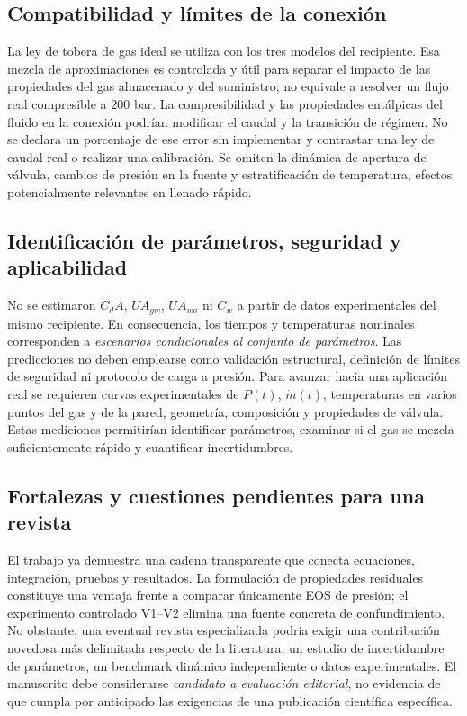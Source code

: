 \documentclass[11pt,letterpaper]{article}
\begin{document}
\subsection{Compatibilidad y límites de la conexión}
La ley de tobera de gas ideal se utiliza con los tres modelos del recipiente. Esa mezcla de aproximaciones es controlada y útil para separar el impacto de las propiedades del gas almacenado y del suministro; no equivale a resolver un flujo real compresible a 200 bar. La compresibilidad y las propiedades entálpicas del fluido en la conexión podrían modificar el caudal y la transición de régimen. No se declara un porcentaje de ese error sin implementar y contrastar una ley de caudal real o realizar una calibración. Se omiten la dinámica de apertura de válvula, cambios de presión en la fuente y estratificación de temperatura, efectos potencialmente relevantes en llenado rápido.

\subsection{Identificación de parámetros, seguridad y aplicabilidad}
No se estimaron $C_dA$, $UA_{gw}$, $UA_{wa}$ ni $C_w$ a partir de datos experimentales del mismo recipiente. En consecuencia, los tiempos y temperaturas nominales corresponden a \emph{escenarios condicionales al conjunto de parámetros}. Las predicciones no deben emplearse como validación estructural, definición de límites de seguridad ni protocolo de carga a presión. Para avanzar hacia una aplicación real se requieren curvas experimentales de $P(t)$, $\dot m(t)$, temperaturas en varios puntos del gas y de la pared, geometría, composición y propiedades de válvula. Estas mediciones permitirían identificar parámetros, examinar si el gas se mezcla suficientemente rápido y cuantificar incertidumbres.

\subsection{Fortalezas y cuestiones pendientes para una revista}
El trabajo ya demuestra una cadena transparente que conecta ecuaciones, integración, pruebas y resultados. La formulación de propiedades residuales constituye una ventaja frente a comparar únicamente EOS de presión; el experimento controlado V1--V2 elimina una fuente concreta de confundimiento. No obstante, una eventual revista especializada podría exigir una contribución novedosa más delimitada respecto de la literatura, un estudio de incertidumbre de parámetros, un benchmark dinámico independiente o datos experimentales. El manuscrito debe considerarse \emph{candidato a evaluación editorial}, no evidencia de que cumpla por anticipado las exigencias de una publicación científica específica.
\end{document}
